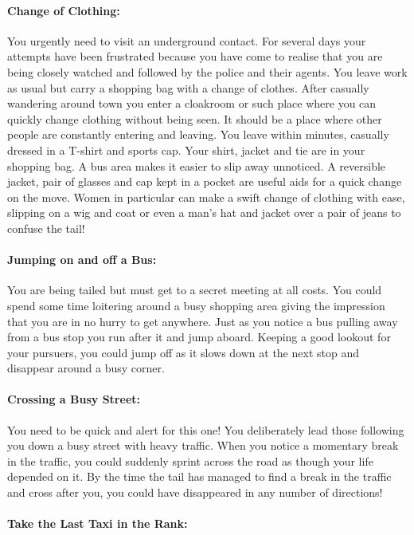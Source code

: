 \paragraph{Change of Clothing:}

You urgently need to visit an underground contact. For several days your
attempts have been frustrated because you have come to realise that you
are being closely watched and followed by the police and their agents.
You leave work as usual but carry a shopping bag with a change of
clothes. After casually wandering around town you enter a cloakroom or
such place where you can quickly change clothing without being seen. It
should be a place where other people are constantly entering and
leaving. You leave within minutes, casually dressed in a T-shirt and
sports cap. Your shirt, jacket and tie are in your shopping bag. A bus
area makes it easier to slip away unnoticed. A reversible jacket, pair
of glasses and cap kept in a pocket are useful aids for a quick change
on the move. Women in particular can make a swift change of clothing
with ease, slipping on a wig and coat or even a man's hat and jacket
over a pair of jeans to confuse the tail!

\paragraph{Jumping on and off a Bus:}

You are being tailed but must get to a secret meeting at all costs. You
could spend some time loitering around a busy shopping area giving the
impression that you are in no hurry to get anywhere. Just as you notice
a bus pulling away from a bus stop you run after it and jump aboard.
Keeping a good lookout for your pursuers, you could jump off as it slows
down at the next stop and disappear around a busy corner.

\paragraph{Crossing a Busy Street:}

You need to be quick and alert for this one! You deliberately lead those
following you down a busy street with heavy traffic. When you notice a
momentary break in the traffic, you could suddenly sprint across the
road as though your life depended on it. By the time the tail has
managed to find a break in the traffic and cross after you, you could
have disappeared in any number of directions!

\paragraph{Take the Last Taxi in the Rank:}

